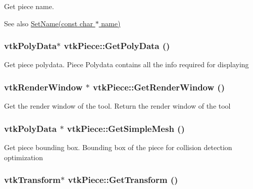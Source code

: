 Get piece name. \begin{DoxySeeAlso}{See also}
\hyperlink{classvtkPiece_ad7a95670a66a62e24e7685a6b8f6dafe}{SetName(const char $\ast$ name)} 
\end{DoxySeeAlso}
\hypertarget{classvtkPiece_a991a9f7eb675432b0a42da9094fbaed0}{
\subsubsection[{GetPolyData}]{\setlength{\rightskip}{0pt plus 5cm}vtkPolyData$\ast$ vtkPiece::GetPolyData ()}}
\label{classvtkPiece_a991a9f7eb675432b0a42da9094fbaed0}


Get piece polydata. Piece Polydata contains all the info required for displaying \hypertarget{classvtkPiece_a996426a2608412e8180fe12bff9ae5d7}{
\subsubsection[{GetRenderWindow}]{\setlength{\rightskip}{0pt plus 5cm}vtkRenderWindow $\ast$ vtkPiece::GetRenderWindow ()}}
\label{classvtkPiece_a996426a2608412e8180fe12bff9ae5d7}


Get the render window of the tool. Return the render window of the tool \hypertarget{classvtkPiece_a44bb3b9c2be3bac663b22c31f98daa09}{
\subsubsection[{GetSimpleMesh}]{\setlength{\rightskip}{0pt plus 5cm}vtkPolyData $\ast$ vtkPiece::GetSimpleMesh ()}}
\label{classvtkPiece_a44bb3b9c2be3bac663b22c31f98daa09}


Get piece bounding box. Bounding box of the piece for collision detection optimization \hypertarget{classvtkPiece_a5f0889b30ed3245f0e0797a94709c583}{
\subsubsection[{GetTransform}]{\setlength{\rightskip}{0pt plus 5cm}vtkTransform$\ast$ vtkPiece::GetTransform ()}}
\label{classvtkPiece_a5f0889b30ed3245f0e0797a94709c583}



